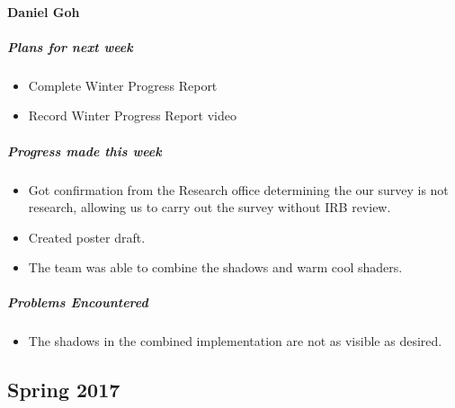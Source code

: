{\paragraph{Daniel Goh}
\subparagraph{Plans for next week}
\begin{itemize}
  \item Complete Winter Progress Report
  \item Record Winter Progress Report video
\end{itemize}

\subparagraph{Progress made this week}
\begin{itemize}
  \item Got confirmation from the Research office determining the our survey is not research, allowing us to carry out the survey without IRB review.
  \item Created poster draft.
  \item The team was able to combine the shadows and warm cool shaders.
\end{itemize}

\subparagraph{Problems Encountered}
\begin{itemize}
  \item The shadows in the combined implementation are not as visible as desired.
\end{itemize}

}

\newpage

\subsection{Spring 2017}

